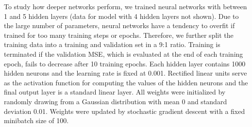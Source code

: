 \documentclass[12pt] {article}
\begin{document}
To study how deeper networks perform, we trained neural networks with between 1 and 5 hidden layers (data for model with 4 hidden layers not shown). Due to the large number of parameters, neural networks have a tendency to overfit if trained for too many training steps or epochs. Therefore, we further split the training data into a training and validation set in a 9:1 ratio. Training is terminated if the validation MSE, which is evaluated at the end of each training epoch, fails to decrease after 10 training epochs. Each hidden layer contains 1000 hidden neurons and the learning rate is fixed at 0.001. Rectified linear units serve as the activation function for computing the values of the hidden neurons and the final output layer is a standard linear layer. All weights were initialized by randomly drawing from a Gaussian distribution with mean 0 and standard deviation 0.01. Weights were updated by stochastic gradient descent with a fixed minibatch size of 100.
\end{document}

